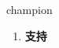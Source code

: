 
\begin{frame}
{\huge champion}
\begin{center}
\begin{enumerate}\Large
  \item \textbf{支持}
\end{enumerate}
\end{center}
\end{frame}
